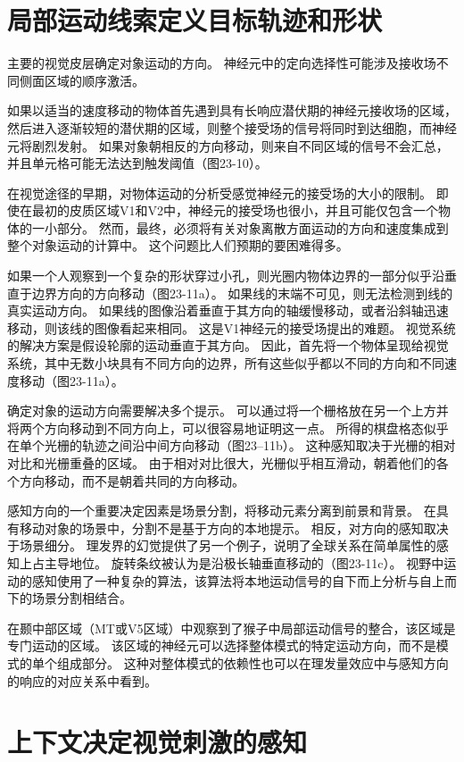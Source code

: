 \section{局部运动线索定义目标轨迹和形状}

主要的视觉皮层确定对象运动的方向。 神经元中的定向选择性可能涉及接收场不同侧面区域的顺序激活。

如果以适当的速度移动的物体首先遇到具有长响应潜伏期的神经元接收场的区域，然后进入逐渐较短的潜伏期的区域，则整个接受场的信号将同时到达细胞，而神经元将剧烈发射。 如果对象朝相反的方向移动，则来自不同区域的信号不会汇总，并且单元格可能无法达到触发阈值（图23-10）。

在视觉途径的早期，对物体运动的分析受感觉神经元的接受场的大小的限制。 即使在最初的皮质区域V1和V2中，神经元的接受场也很小，并且可能仅包含一个物体的一小部分。 然而，最终，必须将有关对象离散方面运动的方向和速度集成到整个对象运动的计算中。 这个问题比人们预期的要困难得多。

如果一个人观察到一个复杂的形状穿过小孔，则光圈内物体边界的一部分似乎沿垂直于边界方向的方向移动（图23-11a）。 如果线的末端不可见，则无法检测到线的真实运动方向。 如果线的图像沿着垂直于其方向的轴缓慢移动，或者沿斜轴迅速移动，则该线的图像看起来相同。 这是V1神经元的接受场提出的难题。 视觉系统的解决方案是假设轮廓的运动垂直于其方向。 因此，首先将一个物体呈现给视觉系统，其中无数小块具有不同方向的边界，所有这些似乎都以不同的方向和不同速度移动（图23-11a）。

确定对象的运动方向需要解决多个提示。 可以通过将一个栅格放在另一个上方并将两个方向移动到不同方向上，可以很容易地证明这一点。 所得的棋盘格态似乎在单个光栅的轨迹之间沿中间方向移动（图23–11b）。 这种感知取决于光栅的相对对比和光栅重叠的区域。 由于相对对比很大，光栅似乎相互滑动，朝着他们的各个方向移动，而不是朝着共同的方向移动。

感知方向的一个重要决定因素是场景分割，将移动元素分离到前景和背景。 在具有移动对象的场景中，分割不是基于方向的本地提示。 相反，对方向的感知取决于场景细分。 理发界的幻觉提供了另一个例子，说明了全球关系在简单属性的感知上占主导地位。 旋转条纹被认为是沿极长轴垂直移动的（图23-11c）。 视野中运动的感知使用了一种复杂的算法，该算法将本地运动信号的自下而上分析与自上而下的场景分割相结合。

在颞中部区域（MT或V5区域）中观察到了猴子中局部运动信号的整合，该区域是专门运动的区域。 该区域的神经元可以选择整体模式的特定运动方向，而不是模式的单个组成部分。 这种对整体模式的依赖性也可以在理发量效应中与感知方向的响应的对应关系中看到。


\section{上下文决定视觉刺激的感知}

